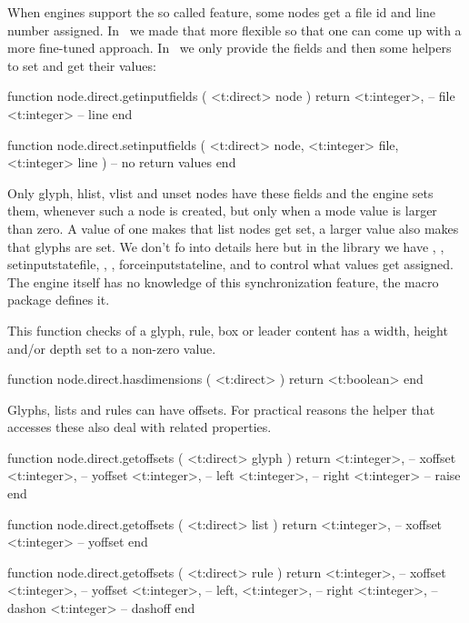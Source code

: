 When engines support the so called  feature, some nodes get a
file id and line number assigned. In \LUATEX\ we made that more flexible
so that one can come up with a more fine-tuned approach. In \LUAMETATEX\ we
only provide the fields and then some helpers to set and get their values:

\starttyping[option=LUA]
function node.direct.getinputfields (
    <t:direct> node
)
    return
        <t:integer>, -- file
        <t:integer>  -- line
end

function node.direct.setinputfields (
    <t:direct>  node,
    <t:integer> file,
    <t:integer> line
)
    -- no return values
end
\stoptyping

Only glyph, hlist, vlist and unset nodes have these fields and the engine sets
them, whenever such a node is created, but only when a mode value is larger than
zero. A value of one makes that list nodes get set, a larger value also makes
that glyphs are set. We don't fo into details here but in the  library
we have , , \typ
{setinputstatefile}, , , \typ
{forceinputstateline},  and  to
control what values get assigned. The engine itself has no knowledge of this
synchronization feature, the macro package defines it.

This function checks of a glyph, rule, box or leader content has a width, height
and/or depth set to a non-zero value.

\starttyping[option=LUA]
function node.direct.hasdimensions ( <t:direct> )
    return <t:boolean>
end
\stoptyping

\stopsubsection

\startsubsection[title={Geometry}]

Glyphs, lists and rules can have offsets. For practical reasons the helper that
accesses these also deal with related properties.

\starttyping[option=LUA]
function node.direct.getoffsets ( <t:direct> glyph )
    return
        <t:integer>, -- xoffset
        <t:integer>, -- yoffset
        <t:integer>, -- left
        <t:integer>, -- right
        <t:integer>  -- raise
end

function node.direct.getoffsets ( <t:direct> list )
    return
        <t:integer>, -- xoffset
        <t:integer>  -- yoffset
end

function node.direct.getoffsets ( <t:direct> rule )
    return
        <t:integer>, -- xoffset
        <t:integer>, -- yoffset
        <t:integer>, -- left,
        <t:integer>, -- right
        <t:integer>, -- dashon
        <t:integer>  -- dashoff
end
\stoptyping

